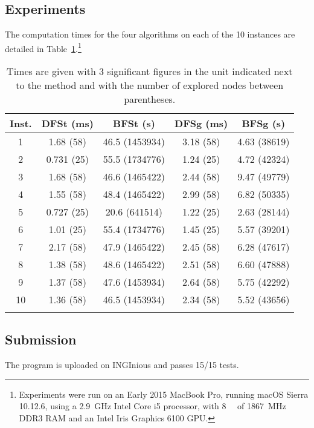 \documentclass[journal]{IEEEtran}
\begin{document}
 \subsection{Experiments}
 The computation times for the four algorithms on each of the 10 instances are detailed in Table~\ref{time1}.\footnote{Experiments were run on an Early 2015 MacBook Pro, running macOS Sierra 10.12.6, using a \SI{2.9}{\giga\hertz} Intel Core i5 processor, with \SI{8}{\giga\byte} of \SI{1867}{\mega\hertz} DDR3 RAM and an Intel Iris Graphics 6100 GPU.} 

\begin{table}[!hbtp]
	\centering
\begin{tabular}{ccccc} 
 \toprule
  Inst. & DFSt (\si{\milli\second}) & BFSt (\si{\second}) & DFSg (\si{\milli\second}) & BFSg (\si{\second})\\
  \midrule
 1 & 1.68 (58) & 46.5 (1453934) & 3.18 (58) & 4.63 (38619) \\
 2 & 0.731 (25) & 55.5 (1734776) & 1.24 (25) & 4.72 (42324) \\
 3 & 1.68 (58) & 46.6 (1465422) & 2.44 (58) & 9.47 (49779) \\
 4 & 1.55 (58) & 48.4 (1465422) & 2.99 (58) & 6.82 (50335) \\
 5 & 0.727 (25) & 20.6 (641514) & 1.22 (25) & 2.63 (28144) \\
 6 & 1.01 (25) & 55.4 (1734776) & 1.45 (25) & 5.57 (39201) \\
 7 & 2.17 (58) & 47.9 (1465422) & 2.45 (58) & 6.28 (47617) \\
 8 & 1.38 (58) & 48.6 (1465422) & 2.51 (58) & 6.60 (47888) \\
 9 & 1.37 (58) & 47.6 (1453934) & 2.64 (58) & 5.75 (42292) \\
 10& 1.36 (58) & 46.5 (1453934) & 2.34 (58) & 5.52 (43656) \\
 \bottomrule\\
\end{tabular}
\caption{Times are given with 3 significant figures in the unit indicated next to the method and with the number of explored nodes between parentheses.}
\label{time1}
\end{table}

 \subsection{Submission}
 The program is uploaded on INGInious and passes 15/15 tests.
\end{document}
